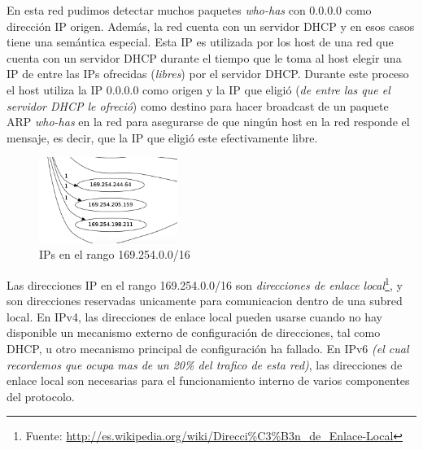 En esta red pudimos detectar muchos paquetes \textit{who-has} con 0.0.0.0 como dirección IP origen. Además, la red cuenta con un servidor DHCP y en esos casos tiene una semántica especial. 
Esta IP es utilizada por los host de una red que cuenta con un servidor DHCP durante el tiempo que le toma al host elegir una IP de entre las IPs ofrecidas (\textit{libres}) por el servidor DHCP. Durante este proceso el host utiliza la IP 0.0.0.0 como origen y la IP que eligió (\textit{de entre las que el servidor DHCP le ofreció}) como destino para hacer broadcast de un paquete ARP \textit{who-has} en la red para asegurarse de que ningún host en la red responde el mensaje, es decir, que la IP que eligió este efectivamente libre.


\begin{figure}[H]
  \centering
    \includegraphics[width=0.4\textwidth]{imagenes/starbucks/unoNueve.png}
  \caption{IPs en el rango 169.254.0.0/16}
  \label{fig:ejemplo}
\end{figure}

Las direcciones IP en el rango 169.254.0.0/16 son \textit{direcciones de enlace local}\footnote{Fuente: \url{http://es.wikipedia.org/wiki/Direcci\%C3\%B3n\_de\_Enlace-Local}}, y son direcciones reservadas unicamente para comunicacion dentro de una subred local. En IPv4, las direcciones de enlace local pueden usarse cuando no hay disponible un mecanismo externo de configuración de direcciones, tal como DHCP, u otro mecanismo principal de configuración ha fallado. En IPv6 \textit{(el cual recordemos que ocupa mas de un 20\% del trafico de esta red)}, las direcciones de enlace local son necesarias para el funcionamiento interno de varios componentes del protocolo.

\newpage
